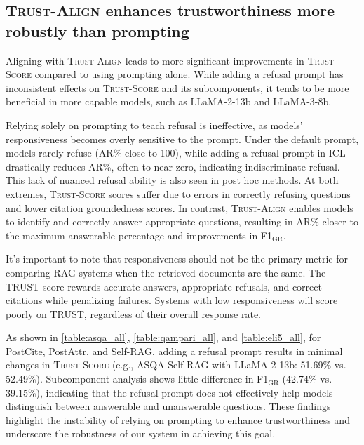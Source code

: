 \documentclass{article} %
\newcommand{\method}[0]{\textsc{Trust-Align}}
\newcommand{\metric}[0]{\textsc{Trust-Score}}
\begin{document}
\subsection{\method{} enhances trustworthiness more robustly than prompting} \label{sec:comparison-prompting}
Aligning with \method{} leads to more significant improvements in \metric{} compared to using prompting alone. While adding a refusal prompt has inconsistent effects on \metric{} and its subcomponents, it tends to be more beneficial in more capable models, such as LLaMA-2-13b and LLaMA-3-8b.

Relying solely on prompting to teach refusal is ineffective, as models' responsiveness becomes overly sensitive to the prompt. Under the default prompt, models rarely refuse (AR\% close to 100), while adding a refusal prompt in ICL drastically reduces AR\%, often to near zero, indicating indiscriminate refusal. This lack of nuanced refusal ability is also seen in post hoc methods. At both extremes, \metric{} scores suffer due to errors in correctly refusing questions and lower citation groundedness scores. In contrast, \method{} enables models to identify and correctly answer appropriate questions, resulting in AR\% closer to the maximum answerable percentage and improvements in F1$_{\text{GR}}$.

It's important to note that responsiveness should not be the primary metric for comparing RAG systems when the retrieved documents are the same. The TRUST score rewards accurate answers, appropriate refusals, and correct citations while penalizing failures. Systems with low responsiveness will score poorly on TRUST, regardless of their overall response rate.

As shown in \cref{table:asqa_all},  \cref{table:qampari_all},  and \cref{table:eli5_all}, for PostCite, PostAttr, and Self-RAG, adding a refusal prompt results in minimal changes in \metric{} (e.g., ASQA Self-RAG with LLaMA-2-13b: 51.69\% vs. 52.49\%). Subcomponent analysis shows little difference in F1$_{\text{GR}}$ (42.74\% vs. 39.15\%), indicating that the refusal prompt does not effectively help models distinguish between answerable and unanswerable questions. These findings highlight the instability of relying on prompting to enhance trustworthiness and underscore the robustness of our system in achieving this goal.
\end{document}
